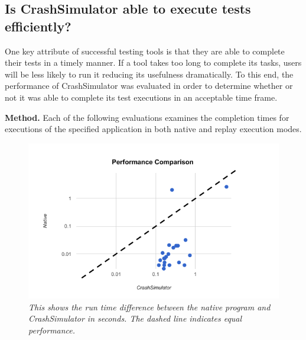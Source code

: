 
\subsection{Is CrashSimulator able to execute tests efficiently?}
\label{sec-perf}


One key attribute of successful testing tools is that they are able to
complete their tests in a timely manner.  If a tool takes too long to
complete its tasks, users will be less likely to run it
reducing its usefulness dramatically. To this end, the
performance of CrashSimulator was evaluated in order to determine whether
or not it was able to complete its test executions in an acceptable time
frame.  

{\bf Method.} Each of the following evaluations examines the completion
times for executions of the specified application in both
native and replay execution modes.


    \begin{figure}[t]
        \center{}
        \includegraphics[scale=.5]{performance.png}
        \caption{\emph{This shows the run time difference between the
native program and CrashSimulator in seconds. The dashed line indicates equal
performance. }}
         \label{figure:performance}

    \end{figure}


